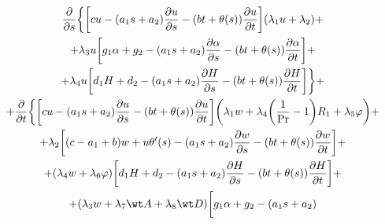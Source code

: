 \begin{multline*} 


\frac{\partial}{\partial s}\bigg\{\bigg[c u- 


(a_1s+a_2)\frac{\partial u}{\partial s}- 


(b t+\theta(s))\frac{\partial u}{\partial t}\bigg] 


(\lambda_1u+\lambda_2) + \\ 


% 


+\lambda_3u\bigg[g_1\alpha+g_2-(a_1s+a_2) 


\frac{\partial\alpha}{\partial s}- 


(b t+\theta(s))\frac{\partial\alpha}{\partial t}\bigg] + \\ 


% 


+\lambda_4u\bigg[d_1H+d_2-(a_1s+a_2) 


\frac{\partial H}{\partial s}-(b t+\theta(s)) 


\frac{\partial H}{\partial t}\bigg]\bigg\}+ \\ 


% 


+\frac{\partial}{\partial t}\bigg\{\bigg[ 


c u-(a_1s+a_2)\frac{\partial u}{\partial s}- 


(b t +\theta(s))\frac{\partial u}{\partial t}\bigg]\bigg( 


\lambda_1w+\lambda_4\bigg(\frac{1}{\Pr}-1\bigg) 


R_1+\lambda_5\varphi\bigg)+ \\ 


% 


+\lambda_2\bigg[(c-a_1+b)w+u\theta'(s)- 


(a_1s+a_2)\frac{\partial w}{\partial s} 


-(b t+\theta(s))\frac{\partial w}{\partial t}\bigg] + \\ 


% 


+(\lambda_4w+\lambda_6\varphi)\bigg[d_1H+d_2- 


(a_1s+a_2)\frac{\partial H}{\partial s}- 


(b t+\theta(s))\frac{\partial H}{\partial t}\bigg]+ \\ 


% 


+(\lambda_3w+\lambda_7\wt A+\lambda_8\wt D)\bigg[ 


g_1\alpha+g_2-(a_1s+a_2) 



\end{multline*}
